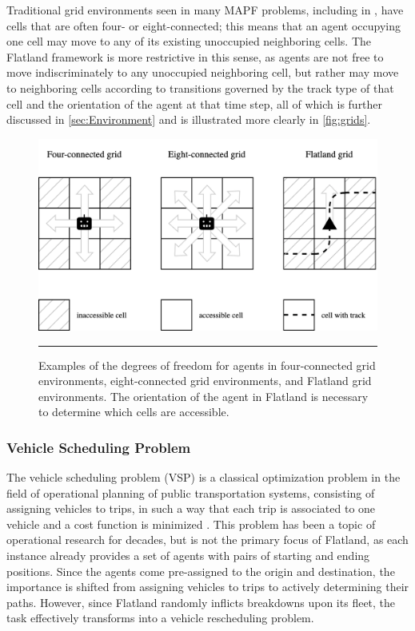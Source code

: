 \documentclass[11pt]{article}
\begin{document}
Traditional grid environments seen in many MAPF problems, including in \citep{standley10a}, have cells that are often four- or eight-connected; this means that an agent occupying one cell may move to any of its existing unoccupied neighboring cells.  The Flatland framework is more restrictive in this sense, as agents are not free to move indiscriminately to any unoccupied neighboring cell, but rather may move to neighboring cells according to transitions governed by the track type of that cell and the orientation of the agent at that time step, all of which is further discussed in \autoref{sec:Environment} and is illustrated more clearly in \autoref{fig:grids}.

\begin{figure}[t]
\centering
\includegraphics[width=\textwidth]{grids}
\caption{Examples of the degrees of freedom for agents in four-connected grid environments, eight-connected grid environments, and Flatland grid environments. The orientation of the agent in Flatland is necessary to determine which cells are accessible. }
\label{fig:grids}

\begin{center}
{\color{lightgray} \rule{\linewidth}{0.15mm}}
\end{center}

\end{figure}

\subsubsection{Vehicle Scheduling Problem}
The vehicle scheduling problem (VSP) is a classical optimization problem in the field of operational planning of public transportation systems, consisting of assigning vehicles to trips, in such a way that each trip is associated to one vehicle and a cost function is minimized \citep{bapeukfa00a}.  This problem has been a topic of operational research for decades, but is not the primary focus of Flatland, as each instance already provides a set of agents with pairs of starting and ending positions. Since the agents come pre-assigned to the origin and destination, the importance is shifted from assigning vehicles to trips to actively determining their paths.  However, since Flatland randomly inflicts breakdowns upon its fleet, the task effectively transforms into a vehicle rescheduling problem.
\end{document}
